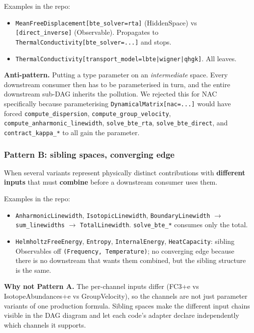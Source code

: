 \documentclass[11pt,a4paper]{article}
\begin{document}
Examples in the repo:
\begin{itemize}[leftmargin=2em]
  \item \texttt{MeanFreeDisplacement[bte\_solver=rta]} (HiddenSpace) vs
        \texttt{[direct\_inverse]} (Observable). Propagates to
        \texttt{ThermalConductivity[bte\_solver=...]} and stops.
  \item \texttt{ThermalConductivity[transport\_model=lbte|wigner|qhgk]}. All leaves.
\end{itemize}
\textbf{Anti-pattern.} Putting a type parameter on an \emph{intermediate} space.
Every downstream consumer then has to be parameterised in turn, and the entire
downstream sub-DAG inherits the pollution. We rejected this for NAC specifically
because parameterising \texttt{DynamicalMatrix[nac=...]} would have forced
\texttt{compute\_dispersion}, \texttt{compute\_group\_velocity},
\texttt{compute\_anharmonic\_linewidth}, \texttt{solve\_bte\_rta},
\texttt{solve\_bte\_direct}, and \texttt{contract\_kappa\_*} to all gain the
parameter.

\subsubsection*{Pattern B: sibling spaces, converging edge}

When several variants represent physically distinct contributions with
\textbf{different inputs} that must \textbf{combine} before a downstream consumer
uses them.

Examples in the repo:
\begin{itemize}[leftmargin=2em]
  \item \texttt{AnharmonicLinewidth}, \texttt{IsotopicLinewidth},
        \texttt{BoundaryLinewidth} $\to$ \texttt{sum\_linewidths} $\to$
        \texttt{TotalLinewidth}. \texttt{solve\_bte\_*} consumes only the total.
  \item \texttt{HelmholtzFreeEnergy}, \texttt{Entropy}, \texttt{InternalEnergy},
        \texttt{HeatCapacity}: sibling Observables off \texttt{(Frequency,
        Temperature)}; no converging edge because there is no downstream that wants
        them combined, but the sibling structure is the same.
\end{itemize}
\textbf{Why not Pattern A.} The per-channel inputs differ (FC3+e vs
IsotopeAbundances+e vs GroupVelocity), so the channels are not just parameter
variants of one production formula. Sibling spaces make the different input chains
visible in the DAG diagram and let each code's adapter declare independently which
channels it supports.
\end{document}
